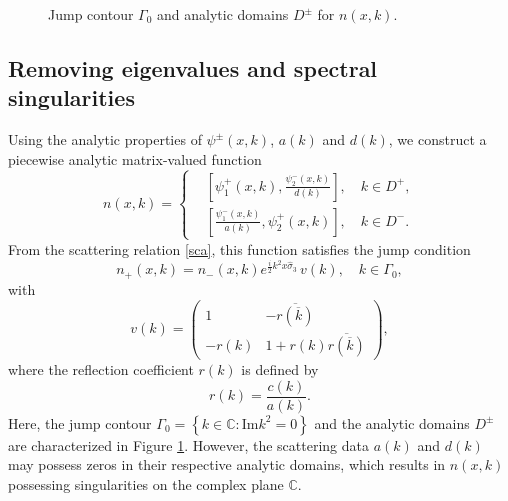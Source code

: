 \documentclass[preprint,compress,12pt]{elsarticle}
\numberwithin{equation}{section}
\begin{document}
\begin{figure}
\begin{center}
\end{center}
\caption{Jump contour $\Gamma_{0}$ and analytic domains $D^{\pm}$ for $n(x,k)$.}
\label{f1}
 \end{figure}
\subsection{Removing eigenvalues and spectral singularities}\label{sub22}
Using the analytic properties of $\psi^{\pm}(x,k)$, $a(k)$ and $d(k)$, we construct a piecewise analytic matrix-valued function
\begin{equation}\label{rhba}
n(x,k)=\left\{
\begin{aligned}
&\left[\psi_{1}^{+}(x,k),\frac{\psi_{2}^{-}(x,k)}{d(k)}\right],\quad k\in D^{+},\\
&\left[\frac{\psi_{1}^{-}(x,k)}{a(k)},\psi_{2}^{+}(x,k)\right],\quad k\in D^{-}.
\end{aligned}
\right.
\end{equation}
From the scattering relation \eqref{sca}, this function satisfies the jump condition
\begin{equation}
n_{+}(x,k)=n_{-}(x,k)e^{\frac{i}{2}k^{2}x\widehat{\sigma}_{3}}\,v(k), \quad k \in \Gamma_{0},
\end{equation}
with
\begin{equation*}
v(k)=\begin{pmatrix}1&-\overline{r(\overline{k})}\\-r(k)&1+r(k)\overline{r(\overline{k})}\end{pmatrix},
\end{equation*}
where the reflection coefficient $r(k)$ is defined by
\begin{equation}
r(k)=\frac{c(k)}{a(k)}.
\end{equation}
Here, the jump contour $\Gamma_{0}=\left\{k\in\mathbb{C}:\text{Im} k^{2}=0\right\}$ and the analytic domains $D^{\pm}$ are characterized in Figure \ref{f1}. However, the scattering data $a(k)$ and $d(k)$ may possess zeros in their respective analytic domains, which results in $n(x,k)$ possessing singularities on the complex plane $\mathbb{C}$.
\end{document}
